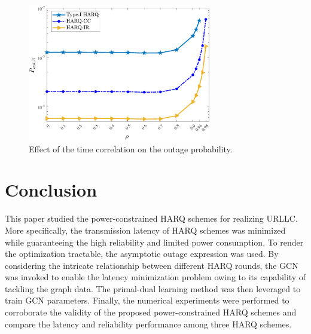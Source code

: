 \documentclass[conference]{IEEEtran}
\begin{document}
\begin{figure}[htbp]
    \centering
    \includegraphics[width=8cm]{factor-outage1.pdf}
    \caption{Effect of the time correlation on the outage probability.}
    \label{FIG6} %
\end{figure}




\section{Conclusion}\label{sec:CONC}
This paper studied the power-constrained HARQ schemes for realizing URLLC. More specifically, the transmission latency of HARQ schemes was minimized while guaranteeing the high reliability and limited power consumption. To render the optimization tractable, the asymptotic outage expression was used. By considering the intricate relationship between different HARQ rounds, the GCN was invoked to enable the latency minimization problem owing to its capability of tackling the graph data. The primal-dual learning method was then leveraged to train GCN parameters. Finally, the numerical experiments were performed to corroborate the validity of the proposed power-constrained HARQ schemes and compare the latency and reliability performance among three HARQ schemes. %




\end{document}
